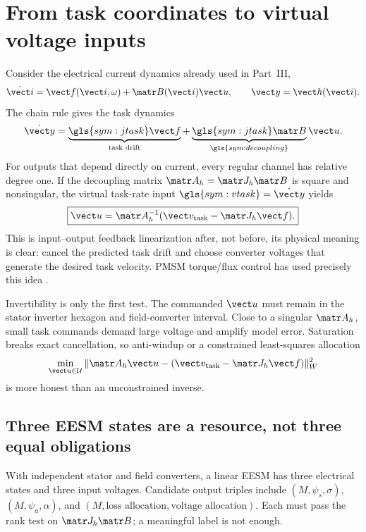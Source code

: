 \section{From task coordinates to virtual voltage inputs}
\label{sec:task-control}

Consider the electrical current dynamics already used in Part~III,
\[
 \dot{\vect i}=\vect f(\vect i,\omega)+\matr B(\vect i)\vect u,
 \qquad \vect y=\vect h(\vect i).
\]
The chain rule gives the task dynamics
\begin{equation}
 \dot{\vect y}=
 \underbrace{\gls{sym:jtask}\vect f}_{\text{task drift}}+
 \underbrace{\gls{sym:jtask}\matr B}_{\gls{sym:decoupling}}\vect u.
 \label{eq:task-output-dynamics}
\end{equation}
For outputs that depend directly on current, every regular channel has relative
degree one. If the decoupling matrix \(\matr A_h=\matr J_h\matr B\) is square
and nonsingular, the virtual task-rate input
\(\gls{sym:vtask}=\dot{\vect y}\) yields
\begin{equation}
 \boxed{\vect u=\matr A_h^{-1}
  (\vect v_{\mathrm{task}}-\matr J_h\vect f).}
 \label{eq:feedback-linearizing-input}
\end{equation}
This is input--output feedback linearization after, not before, its physical
meaning is clear: cancel the predicted task drift and choose converter
voltages that generate the desired task velocity. PMSM torque/flux control
has used precisely this idea \cite{lascu2012feedback,choi2016feedback}.

Invertibility is only the first test. The commanded \(\vect u\) must remain in
the stator inverter hexagon and field-converter interval. Close to a singular
\(\matr A_h\), small task commands demand large voltage and amplify model
error. Saturation breaks exact cancellation, so anti-windup or a constrained
least-squares allocation
\[
 \min_{\vect u\in\mathcal U}
 \|\matr A_h\vect u-(\vect v_{\mathrm{task}}-\matr J_h\vect f)\|_W^2
\]
is more honest than an unconstrained inverse.

\subsection{Three EESM states are a resource, not three equal obligations}

With independent stator and field converters, a linear EESM has three
electrical states and three input voltages. Candidate output triples include
\((M,\psi_s,\sigma)\), \((M,\psi_a,\alpha)\), and
\((M,\text{loss allocation},\text{voltage allocation})\). Each must pass the
rank test on \(\matr J_h\matr B\); a meaningful label is not enough.


